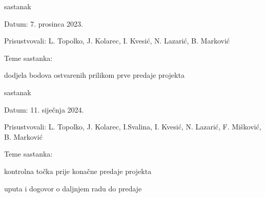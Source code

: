 \begin{packed_enum}
			
			\item  sastanak
			\item[] \begin{packed_item}
				\item Datum: 7. prosinca 2023.
				\item Prisustvovali: L. Topolko, J. Kolarec, I. Kvesić, N. Lazarić, B. Marković
				\item Teme sastanka:
				\begin{packed_item}
					\item dodjela bodova ostvarenih prilikom prve predaje projekta
				\end{packed_item}
			\end{packed_item}
			
			
			
			\item  sastanak
			\item[] \begin{packed_item}
				\item Datum: 11. siječnja 2024.
				\item Prisustvovali: L. Topolko, J. Kolarec, I.Svalina, I. Kvesić, N. Lazarić, F. Mišković, B. Marković
				\item Teme sastanka:
				\begin{packed_item}
					\item kontrolna točka prije konačne predaje projekta
					\item uputa i dogovor o daljnjem radu do predaje 
				\end{packed_item}
			\end{packed_item}
			
			
		
		
		
		\end{packed_enum}
		
